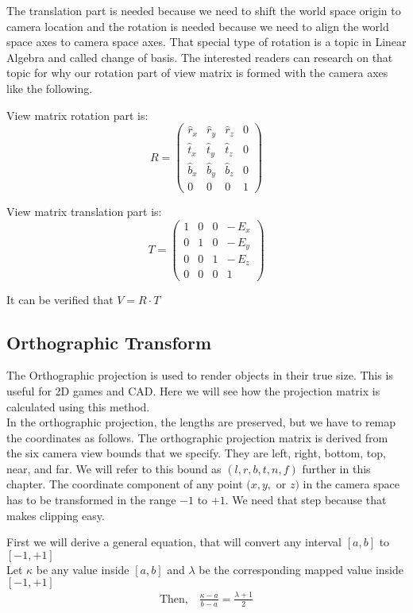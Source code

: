 The translation part is needed because we need to shift the world space origin to camera location and the rotation is needed because we need to align the world space axes to camera space axes. That special type of rotation is a topic in Linear Algebra and called change of basis. The interested readers can research on that topic for why our rotation part of view matrix is formed with the camera axes like the following.

View matrix rotation part is:
\begin{equation}
R =
\begin{pmatrix}
\hat{r}_x & \hat{r}_y & \hat{r}_z & 0 \\
\hat{t}_x & \hat{t}_y & \hat{t}_z & 0 \\
\hat{b}_x & \hat{b}_y & \hat{b}_z & 0 \\
0         & 0         & 0         & 1
\end{pmatrix}
\end{equation}

View matrix translation part is:
\begin{equation}
T =
\begin{pmatrix}
1 & 0 & 0 & -\,E_x \\
0 & 1 & 0 & -\,E_y \\
0 & 0 & 1 & -\,E_z  \\
0 & 0 & 0 & 1
\end{pmatrix}
\end{equation}

It can be verified that $V = R \cdot T$


\subsection{Orthographic Transform}
The Orthographic projection is used to render objects in their true size. This is useful for 2D games and CAD.
Here we will see how the projection matrix is calculated using this method.\\
In the orthographic projection, the lengths are preserved, but we have to remap the coordinates as follows.
The orthographic projection matrix is derived from the six camera view bounds that we specify. They are left, right, bottom, top, near, and far. We will refer to this bound as $(l, r, b, t, n, f)$ further in this chapter. The coordinate component of any point $(x, y,$ or $z)$ in the camera space has to be transformed in the range $-1$ to $+1$. We need that step because that makes clipping easy.

First we will derive a general equation, that will convert any interval $[a,b]$ to $[-1,+1]$\\
Let $\kappa$ be any value inside $[a,b]$ and $\lambda$ be the corresponding mapped value inside $[-1,+1]$\\
\begin{align*}
\text{Then,}\quad \frac{\kappa-a}{b-a} = \frac{\lambda+1}{2}
\end{align*}

